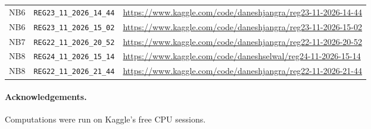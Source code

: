 \documentclass[11pt]{article}
\begin{document}
\begin{table}[h]
{\begin{tabular}{lll}
NB6 & \texttt{REG23\_11\_2026\_14\_44} & \url{https://www.kaggle.com/code/daneshjangra/reg23-11-2026-14-44}\\
NB6 & \texttt{REG23\_11\_2026\_15\_02} & \url{https://www.kaggle.com/code/daneshjangra/reg23-11-2026-15-02}\\
NB7 & \texttt{REG22\_11\_2026\_20\_52} & \url{https://www.kaggle.com/code/daneshjangra/reg22-11-2026-20-52}\\
NB8 & \texttt{REG24\_11\_2026\_15\_14} & \url{https://www.kaggle.com/code/daneshselwal/reg24-11-2026-15-14}\\
NB8 & \texttt{REG22\_11\_2026\_21\_44} & \url{https://www.kaggle.com/code/daneshjangra/reg22-11-2026-21-44}\\
\bottomrule\end{tabular}}\end{table}
\paragraph{Acknowledgements.} Computations were run on Kaggle's free CPU sessions.
\FloatBarrier

\appendix
\end{document}
